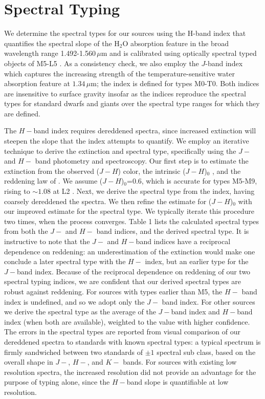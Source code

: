 \section{Spectral Typing}
We determine the spectral types for our sources using the H-band index that quantifies the spectral slope of the H$_{2}$O absorption feature in the broad wavelength range 1.492-1.560$\, \mu$m and is calibrated using optically spectral typed objects of M5-L5 \citep{allers07}.  As a consistency check, we also employ the \citet{slesnick04} $J$-band index which captures the increasing strength of the temperature-sensitive water absorption feature at $1.34 \,\mu$m; the index is defined for types M0-T0.  Both indices are insensitive to surface gravity \citep{slesnick04,allers07} insofar as the indices reproduce the spectral types for standard dwarfs and giants over the spectral type ranges for which they are defined.

The \citet{allers07} $H-$band index requires dereddened spectra, since increased extinction will steepen the slope that the index attempts to quantify.  We employ an iterative technique to derive the extinction and spectral type, specifically using the $J-$ and $H-$ band photometry and spectroscopy.  Our first step is to estimate the extinction from the observed ($J-H$) color, the intrinsic ($J-H$)$_{0}$ \citep{patten06}, and the reddening law of \citet{fitzpatrick1999}.  We assume ($J-H$)$_{0}$=0.6, which is accurate for types M5-M9, rising to $\sim1.08$ at L2 \citep{patten06}.  Next, we derive the spectral type from the \citet{allers07} index, having coarsely dereddened the spectra.  We then refine the estimate for ($J-H$)$_{0}$ with our improved estimate for the spectral type.  We typically iterate this procedure two times, when the process converges.  Table 1 lists the calculated spectral types from both the $J-$ and $H-$ band indices, and the derived spectral type.  It is instructive to note that the $J-$ and $H-$band indices have a reciprocal dependence on reddening: an underestimation of the extinction would make one conclude a later spectral type with the $H-$ index, but an earlier type for the $J-$band index.  Because of the reciprocal dependence on reddening of our two spectral typing indices, we are confident that our derived spectral types are robust against reddening.  For sources with types earlier than M5, the $H-$ band index is undefined, and so we adopt only the $J-$ band index.  For other sources we derive the spectral type as the average of the $J-$band index and $H-$band index (when both are available), weighted to the value with higher confidence.  The errors in the spectral types are reported from visual comparison of our dereddened spectra to standards with known spectral types: a typical spectrum is firmly sandwiched between two standards of $\pm1$ spectral sub class, based on the overall shape in $J-$, $H-$, and $K-$ bands.  For sources with existing low resolution spectra, the increased resolution did not provide an advantage for the purpose of typing alone, since the $H-$band slope is quantifiable at low resolution.  

